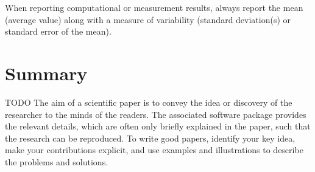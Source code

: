 \documentclass[10pt,conference,compsocconf]{IEEEtran}
\begin{document}
When reporting computational or measurement results, always
report the mean (average value) along with a measure of variability
(standard deviation(s) or standard error of the mean).







\section{Summary}

TODO
The aim of a scientific paper is to convey the idea or discovery of
the researcher to the minds of the readers. The associated software
package provides the relevant details, which are often only briefly
explained in the paper, such that the research can be reproduced.
To write good papers, identify your key idea, make your contributions
explicit, and use examples and illustrations to describe the problems
and solutions.





\end{document}
